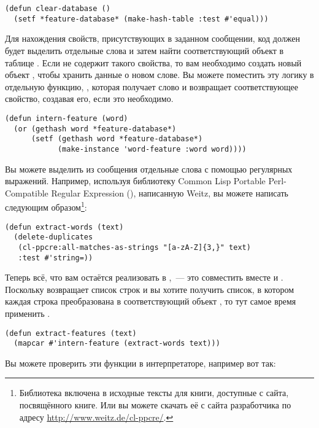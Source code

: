 \begin{lstlisting}
(defun clear-database ()
  (setf *feature-database* (make-hash-table :test #'equal)))
\end{lstlisting}

Для нахождения свойств, присутствующих в заданном сообщении, код должен будет выделить
отдельные слова и затем найти соответствующий объект  в таблице
.  Если  не содержит такого свойства, то вам
необходимо создать новый объект , чтобы хранить данные о новом слове.  Вы
можете поместить эту логику в отдельную функцию, , которая получает
слово и возвращает соответствующее свойство, создавая его, если это необходимо.

\begin{lstlisting}
(defun intern-feature (word)
  (or (gethash word *feature-database*)
      (setf (gethash word *feature-database*)
            (make-instance 'word-feature :word word))))
\end{lstlisting}

Вы можете выделить из сообщения отдельные слова с помощью регулярных выражений.  Например,
используя библиотеку Common Lisp Portable Perl-Compatible Regular Expression
(), написанную Weitz, вы можете написать  следующим
образом\footnote{Библиотека  включена в исходные тексты для книги,
  доступные с сайта, посвящённого книге.  Или вы можете скачать её с сайта разработчика по
  адресу \url{http://www.weitz.de/cl-ppcre/}.}:

\begin{lstlisting}
(defun extract-words (text)
  (delete-duplicates
   (cl-ppcre:all-matches-as-strings "[a-zA-Z]{3,}" text)
   :test #'string=))
\end{lstlisting}

Теперь всё, что вам остаётся реализовать в ,~--- это совместить
вместе  и .  Поскольку 
возвращает список строк и вы хотите получить список, в котором каждая строка преобразована
в соответствующий объект , то тут самое время применить .

\begin{lstlisting}
(defun extract-features (text)
  (mapcar #'intern-feature (extract-words text)))
\end{lstlisting}

Вы можете проверить эти функции в интерпретаторе, например вот так:

